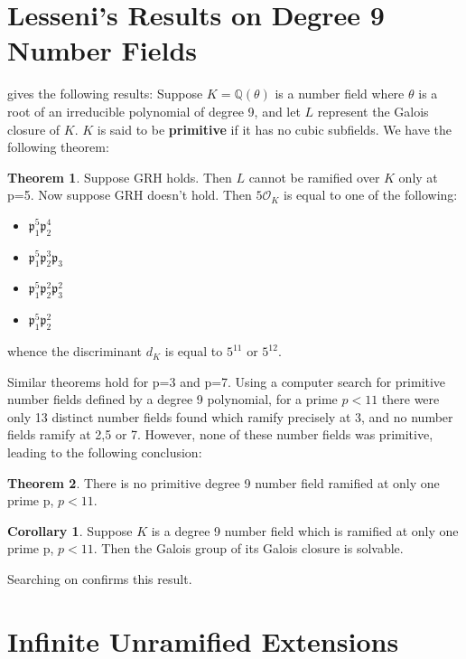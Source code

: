 \documentclass[12pt]{extarticle}
\newcommand{\<}{\langle}
\renewcommand{\>}{\rangle}
\theoremstyle{definition}
\newtheorem{theorem}{Theorem}
\newtheorem{corollary}{Corollary}
\begin{document}
\section{Lesseni's Results on Degree 9 Number Fields}
\cite{LESSENI} gives the following results:
Suppose $K=\mathbb{Q}(\theta)$ is a number field where $\theta$ is a root of an irreducible polynomial of degree 9, and let $L$ represent the Galois closure of $K$. $K$ is said to be \textbf{primitive} if it has no cubic subfields. We have the following theorem: \begin{theorem}
    Suppose GRH holds. Then $L$ cannot be ramified over $K$ only at p=5. Now suppose GRH doesn't hold. Then $5\mathcal{O}_K$ is equal to one of the following: \begin{itemize}
        \item $\mathfrak{p}_1^5\mathfrak{p}_2^4$
        \item $\mathfrak{p}_1^5\mathfrak{p}_2^3\mathfrak{p}_3$
        \item $\mathfrak{p}_1^5\mathfrak{p}_2^2\mathfrak{p}_3^2$
        \item  $\mathfrak{p}_1^5\mathfrak{p}_2^2$
    \end{itemize}
    whence the discriminant $d_K$ is equal to $5^{11}$ or $5^{12}$. 
\end{theorem}
Similar theorems hold for p=3 and p=7.  Using a computer search for primitive number fields defined by a degree 9 polynomial, for a prime $p<11$ there were only 13 distinct number fields found which ramify precisely at 3, and no number fields ramify at 2,5 or 7. However, none of these number fields was primitive, leading to the following conclusion:
\begin{theorem}
    There is no primitive degree 9 number field ramified at only one prime p, $p<11$.
\end{theorem}
\begin{corollary}
 Suppose $K$ is a degree 9 number field which is ramified at only one prime p, $p<11$. Then the Galois group of its Galois closure is solvable. 
\end{corollary}
Searching on \cite{JONE2} confirms this result. 


\section{Infinite Unramified Extensions}
\end{document}
